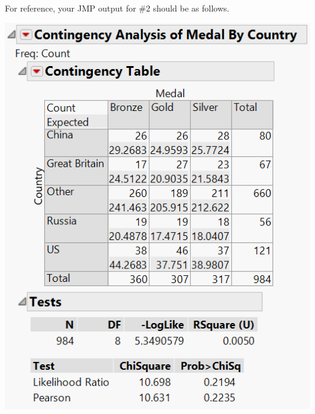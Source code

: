 \documentclass[noanswers]{exam}
\begin{document}
\begin{questions}
\begin{parts}
\begin{solution}[\stretch{1}]
For reference, your JMP output for \#2 should be as follows.

\vspace{3mm}

\includegraphics[scale=1]{STAT_2300_Practice_12-2_JMP.PNG}

\end{solution}

\end{parts}

\end{questions}
\end{document}
